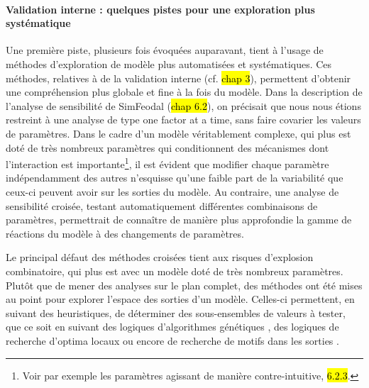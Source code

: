 \paragraph{Validation interne : quelques pistes pour une exploration plus systématique}
Une première piste, plusieurs fois évoquées auparavant, tient à l'usage de méthodes d'exploration de modèle plus automatisées et systématiques.
Ces méthodes, relatives à de la validation interne (cf. \hl{chap 3}), permettent d'obtenir une compréhension plus globale et fine à la fois du modèle.
Dans la description de l'analyse de sensibilité de SimFeodal (\hl{chap 6.2}), on précisait que nous nous étions restreint à une analyse de type \og one factor at a time\fg{}, sans faire covarier les valeurs de paramètres.
Dans le cadre d'un modèle véritablement complexe, qui plus est doté de très nombreux paramètres qui conditionnent des mécanismes dont l'interaction est importante\footnote{
 Voir par exemple les paramètres agissant de manière contre-intuitive, \hl{6.2.3}.
}, il est évident que modifier chaque paramètre indépendamment des autres n'esquisse qu'une faible part de la variabilité que ceux-ci peuvent avoir sur les sorties du modèle.
Au contraire, une analyse de sensibilité croisée, testant automatiquement différentes combinaisons de paramètres, permettrait de connaître de manière plus approfondie la gamme de réactions du modèle à des changements de paramètres.

\noindent Le principal défaut des méthodes croisées tient aux risques d'explosion combinatoire, qui plus est avec un modèle doté de très nombreux paramètres.
Plutôt que de mener des analyses sur le plan complet, des méthodes ont été mises au point pour explorer l'espace des sorties d'un modèle.
Celles-ci permettent, en suivant des heuristiques, de déterminer des sous-ensembles de valeurs à tester, que ce soit en suivant des logiques d'algorithmes génétiques \autocite{schmitt_half_2015,rey-coyrehourcq_plateforme_2015}, des logiques de recherche d'optima locaux \autocite{schmitt_modelisation_2014, reuillon_new_2015} ou encore de recherche de motifs dans les sorties \autocite{cherel_beyond_2015}.

